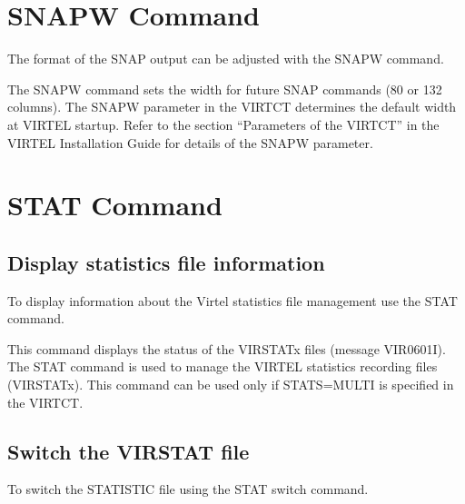 \documentclass[letterpaper,10pt,english]{sphinxmanual}
\begin{document}
\section{SNAPW Command}
\label{\detokenize{audit_operations_ and_performance:snapw-command}}\label{\detokenize{audit_operations_ and_performance:index-21}}
The format of the SNAP output can be adjusted with the SNAPW command.

\begin{sphinxVerbatim}[commandchars=\\\{\}]
  
\end{sphinxVerbatim}

The SNAPW command sets the width for future SNAP commands (80 or 132 columns). The SNAPW parameter in the VIRTCT determines the default width at VIRTEL startup. Refer to the section “Parameters of the VIRTCT” in the VIRTEL Installation Guide for details of the SNAPW parameter.

\ignorespaces 

\section{STAT Command}
\label{\detokenize{audit_operations_ and_performance:stat-command}}\label{\detokenize{audit_operations_ and_performance:index-22}}

\subsection{Display statistics file information}
\label{\detokenize{audit_operations_ and_performance:display-statistics-file-information}}
To display information about the Virtel statistics file management use the STAT command.

\begin{sphinxVerbatim}[commandchars=\\\{\}]
\end{sphinxVerbatim}

This command displays the status of the VIRSTATx files (message VIR0601I). The STAT command is used to manage the VIRTEL statistics recording files (VIRSTATx). This command can be used only if STATS=MULTI is specified in the VIRTCT.


\subsection{Switch the VIRSTAT file}
\label{\detokenize{audit_operations_ and_performance:switch-the-virstat-file}}
To switch the STATISTIC file using the STAT switch command.
\end{document}
